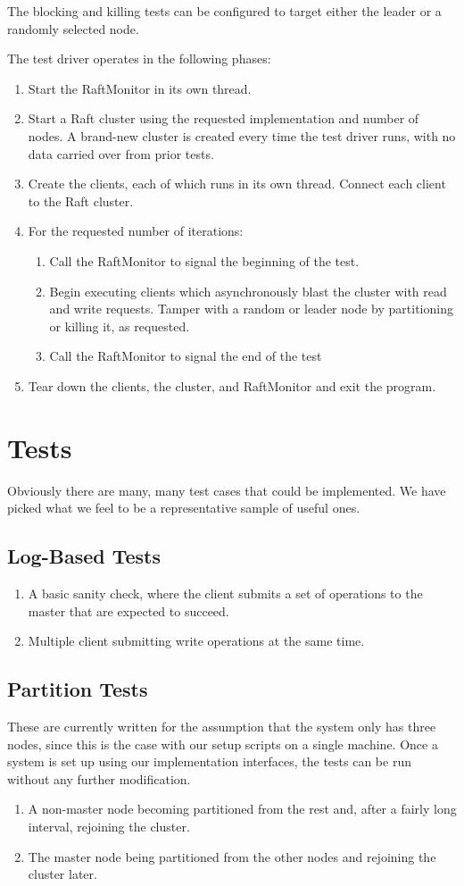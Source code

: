 \documentclass[UTF8]{article}
\begin{document}
The blocking and killing tests can be configured to target either the leader or a randomly selected node.

The test driver operates in the following phases:

\begin{enumerate}
  \item Start the RaftMonitor in its own thread.
  \item Start a Raft cluster using the requested implementation and number of nodes. A brand-new cluster is created every time the test driver runs, with no data carried over from prior tests.
  \item Create the clients, each of which runs in its own thread. Connect each client to the Raft cluster.
  \item For the requested number of iterations:
    \begin{enumerate}
      \item Call the RaftMonitor to signal the beginning of the test.
      \item Begin executing clients which asynchronously blast the cluster with read and write requests. Tamper with a random or leader node by partitioning or killing it, as requested.
      \item Call the RaftMonitor to signal the end of the test
    \end{enumerate}
  \item Tear down the clients, the cluster, and RaftMonitor and exit the program.
\end{enumerate}

\section{Tests}
Obviously there are many, many test cases that could be implemented. We have picked what we feel to be a representative sample of useful ones.
\subsection{Log-Based Tests}
\begin{enumerate}
  \item A basic sanity check, where the client submits a set of operations to the master that are expected to succeed.
  \item Multiple client submitting write operations at the same time.
\end{enumerate}
\subsection{Partition Tests}
These are currently written for the assumption that the system only has three nodes, since this is the case with our setup scripts on a single machine. Once a system is set up using our implementation interfaces, the tests can be run without any further modification. 
\begin{enumerate}
  \item A non-master node becoming partitioned from the rest and, after a fairly long interval, rejoining the cluster.
  \item The master node being partitioned from the other nodes and rejoining the cluster later.
\end{enumerate}
\end{document}
